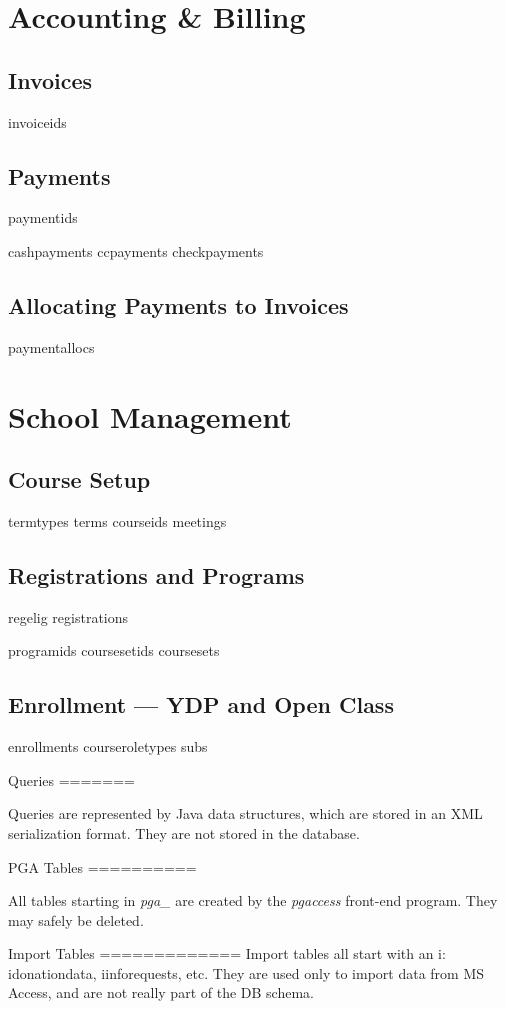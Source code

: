 \section{Accounting \& Billing}

\subsection{Invoices}

  invoiceids

\subsection{Payments}
  paymentids

  cashpayments
  ccpayments
  checkpayments

\subsection{Allocating Payments to Invoices}
  paymentallocs

\section{School Management}

\subsection{Course Setup}

  termtypes
  terms
  courseids
  meetings

\subsection{Registrations and Programs}

  regelig
  registrations

  programids
  coursesetids
  coursesets

\subsection{Enrollment --- YDP and Open Class}

  enrollments
  courseroletypes
  subs





Queries
=======

Queries are represented by Java data structures, which are stored in an XML serialization format.  They are not stored in the database.

PGA Tables
==========

All tables starting in \emph{pga_} are created by the \emph{pgaccess} front-end program.  They may safely be deleted.


Import Tables
=============
Import tables all start with an i: idonationdata, iinforequests, etc.  They are used only to import data from MS Access, and are not really part of the DB schema.
